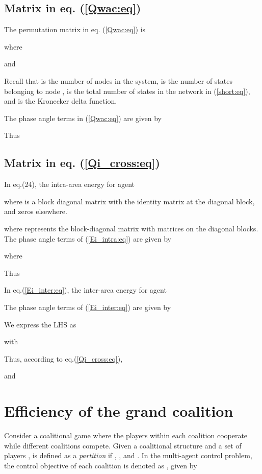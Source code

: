 \documentclass[12pt, draftclsnofoot,onecolumn]{IEEEtran}
\begin{document}
 \subsection{Matrix  in eq. (\ref{Qwac:eq})}

The permutation matrix  in eq. (\ref{Qwac:eq}) is

\noindent where

\noindent and

\noindent Recall that  is the number of nodes in the system,  is the number of states belonging to node ,  is the total number of states in the network in (\ref{short:eq}), and  is the Kronecker delta function.

The phase angle terms in (\ref{Qwac:eq}) are given by

\noindent Thus 
 



\subsection{Matrix  in eq. (\ref{Qi_cross:eq})}

In eq.(24), the intra-area energy for agent 


\noindent where  is a block diagonal matrix with the identity matrix  at the  diagonal block, and zeros elsewhere.

\noindent where  represents the block-diagonal matrix with matrices  on the diagonal blocks. The phase angle terms of (\ref{Ei_intra:eq}) are given by


\noindent where
 
\noindent Thus



In eq.(\ref{Ei_inter:eq}), the inter-area energy for agent 


\noindent The phase angle terms of (\ref{Ei_inter:eq}) are given by

\noindent We express the LHS as
 
\noindent with


Thus, according to eq.(\ref{Qi_cross:eq}),

\noindent and




\section{Efficiency of the grand coalition}



Consider a coalitional game where the players within each coalition cooperate while different coalitions compete. Given a coalitional structure  and a set of players ,  is defined as a {\it partition} if , , and  . In the multi-agent control problem, the control objective of each coalition  is denoted as , given by
\end{document}
